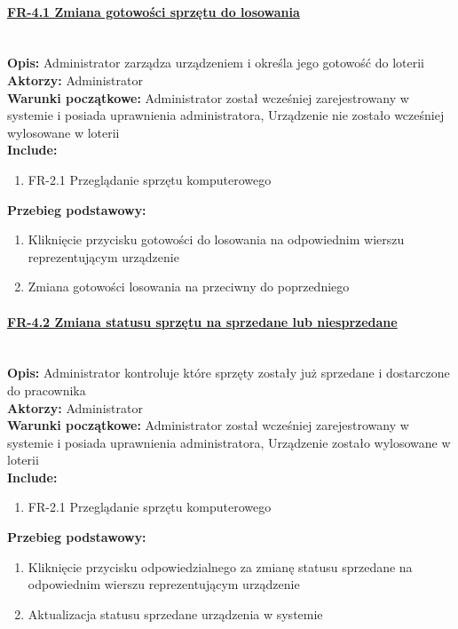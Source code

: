\paragraph{\underline{FR-4.1 Zmiana gotowości sprzętu do losowania}}\mbox{}\\[1mm]
	\noindent\textbf{Opis:} Administrator zarządza urządzeniem i określa jego gotowość do loterii\\
	\noindent\textbf{Aktorzy:} Administrator\\
	\textbf{Warunki początkowe:} Administrator został wcześniej zarejestrowany w systemie i posiada uprawnienia administratora, Urządzenie nie zostało wcześniej wylosowane w loterii\\
	\textbf{Include:} 
	\begin{enumerate}[noparskip]
		\item FR-2.1 Przeglądanie sprzętu komputerowego
	\end{enumerate}
    \textbf{Przebieg podstawowy:}
	\begin{enumerate}[noparskip]
		\item Kliknięcie przycisku gotowości do losowania na odpowiednim wierszu reprezentującym urządzenie
		\item Zmiana gotowości losowania na przeciwny do poprzedniego
    \end{enumerate}

\paragraph{\underline{FR-4.2 Zmiana statusu sprzętu na sprzedane lub niesprzedane}}\mbox{}\\[1mm]
	\noindent\textbf{Opis:} Administrator kontroluje które sprzęty zostały już sprzedane i dostarczone do pracownika\\
	\noindent\textbf{Aktorzy:} Administrator\\
	\textbf{Warunki początkowe:} Administrator został wcześniej zarejestrowany w systemie i posiada uprawnienia administratora, Urządzenie zostało wylosowane w loterii\\
	\textbf{Include:} 
	\begin{enumerate}[noparskip]
		\item FR-2.1 Przeglądanie sprzętu komputerowego
	\end{enumerate}
    \textbf{Przebieg podstawowy:}
	\begin{enumerate}[noparskip]
		\item Kliknięcie przycisku odpowiedzialnego za zmianę statusu sprzedane na odpowiednim wierszu reprezentującym urządzenie
		\item Aktualizacja statusu sprzedane urządzenia w systemie
    \end{enumerate}

